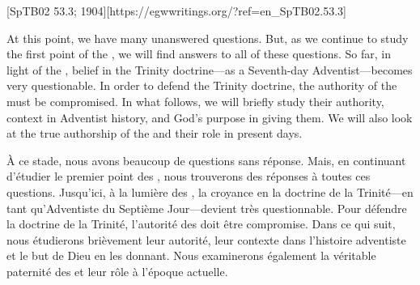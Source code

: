 [SpTB02 53.3; 1904][https://egwwritings.org/?ref=en\_SpTB02.53.3]


At this point, we have many unanswered questions. But, as we continue to study the first point of the , we will find answers to all of these questions. So far, in light of the , belief in the Trinity doctrine—as a Seventh-day Adventist—becomes very questionable. In order to defend the Trinity doctrine, the authority of the  must be compromised. In what follows, we will briefly study their authority, context in Adventist history, and God’s purpose in giving them. We will also look at the true authorship of the  and their role in present days.


À ce stade, nous avons beaucoup de questions sans réponse. Mais, en continuant d'étudier le premier point des , nous trouverons des réponses à toutes ces questions. Jusqu'ici, à la lumière des , la croyance en la doctrine de la Trinité—en tant qu'Adventiste du Septième Jour—devient très questionnable. Pour défendre la doctrine de la Trinité, l'autorité des  doit être compromise. Dans ce qui suit, nous étudierons brièvement leur autorité, leur contexte dans l'histoire adventiste et le but de Dieu en les donnant. Nous examinerons également la véritable paternité des  et leur rôle à l'époque actuelle.
